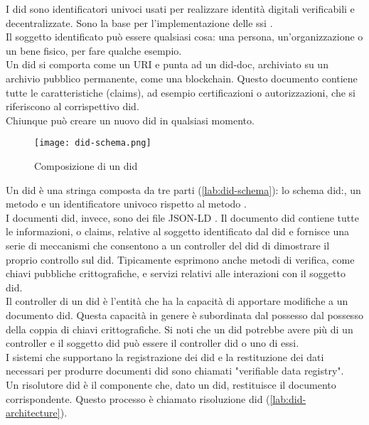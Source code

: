I \gls{did} sono identificatori univoci usati per realizzare identità digitali verificabili e decentralizzate. Sono la base per l'implementazione delle \gls{ssi} \cite{art:ssi}. \\
Il soggetto identificato può essere qualsiasi cosa: una persona, un'organizzazione o un bene fisico, per fare qualche esempio. \\
Un \gls{did} si comporta come un URI e punta ad un \gls{did-doc}, archiviato su un archivio pubblico permanente, come una blockchain.
Questo documento contiene tutte le caratteristiche (claims), ad esempio certificazioni o autorizzazioni, che si riferiscono al corrispettivo \gls{did}. \\
Chiunque può creare un nuovo \gls{did} in qualsiasi momento.

\begin{figure}[ht]
    \texttt{[image: did-schema.png]}
    \centering
    \caption{Composizione di un \gls{did} \cite{img:did-schema}}
    \label{lab:did-schema}
\end{figure}

Un \gls{did} è una stringa composta da tre parti (\autoref{lab:did-schema}): lo schema did:, un metodo e un identificatore univoco rispetto al metodo \cite{wiki:did}. \\
I documenti \gls{did}, invece, sono dei file JSON-LD \cite{wiki:json-ld}. Il documento \gls{did} contiene tutte le informazioni, o claims, 
relative al soggetto identificato dal \gls{did} e fornisce una serie di meccanismi che consentono a un controller del \gls{did} di dimostrare il proprio controllo sul \gls{did}. 
Tipicamente esprimono anche metodi di verifica, come chiavi pubbliche crittografiche, e servizi relativi alle interazioni con il soggetto \gls{did}. \\
Il controller di un \gls{did} è l'entità che ha la capacità di apportare modifiche a un documento \gls{did}. Questa capacità in genere è subordinata dal possesso dal possesso della coppia di chiavi crittografiche. 
Si noti che un \gls{did} potrebbe avere più di un controller e il soggetto \gls{did} può essere il controller \gls{did} o uno di essi. \\
I sistemi che supportano la registrazione dei \gls{did} e la restituzione dei dati necessari per produrre documenti \gls{did} sono chiamati "verifiable data registry". \\
Un risolutore \gls{did} è il componente che, dato un \gls{did}, restituisce il documento corrispondente. Questo processo è chiamato risoluzione \gls{did} (\autoref{lab:did-architecture}).

